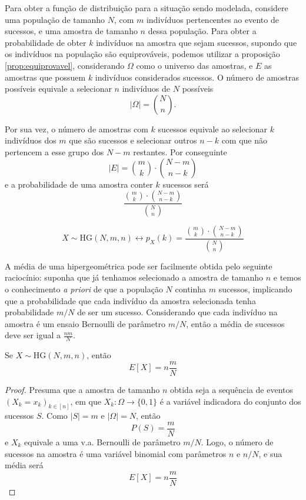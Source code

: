 Para obter a função de distribuição para a situação sendo modelada, considere uma população
de tamanho $N$, com $m$ indivíduos pertencentes ao evento de sucessos, e uma amostra de
tamanho $n$ dessa população. Para obter a probabilidade de obter $k$ indivíduos na amostra
que sejam sucessos, supondo que os indivíduos na população são equiprováveis, podemos
utilizar a proposição \ref{prop:equiprovavel}, considerando $\Omega$ como o universo das
amostras, e $E$ as amostras que possuem $k$ indivíduos considerados sucessos. O número de
amostras possíveis equivale a selecionar $n$ indivíduos de $N$ possíveis
\[
	|\Omega| = \binom{N}{n}.
\]

Por sua vez, o número de amostras com $k$ sucessos equivale ao selecionar $k$ indivíduos
dos $m$ que são sucessos e selecionar outros $n-k$ com que não pertencem a esse grupo dos
$N-m$ restantes. Por conseguinte
\[
	|E| = \binom{m}{k} \cdot \binom{N-m}{n-k}
\]
e a probabilidade de uma amostra conter $k$ sucessos será
\[
	\frac{\binom{m}{k} \cdot \binom{N-m}{n-k}}{\binom{N}{n}}
\]

\begin{def:hipergeometrica}
\[
	X \sim \mathrm{HG}(N, m, n) \longleftrightarrow p_X(k) =
	\frac{\binom{m}{k} \cdot \binom{N-m}{n-k}}{\binom{N}{n}}
\]
\end{def:hipergeometrica}

A média de uma hipergeométrica pode ser facilmente obtida pelo seguinte
raciocínio: suponha que já tenhamos selecionado a amostra de tamanho $n$ e temos
o conhecimento \textit{a priori} de que a população $N$ continha $m$ sucessos,
implicando que a probabilidade que cada indivíduo da amostra selecionada tenha
probabilidade $m / N$ de ser um sucesso. Considerando que cada indivíduo na
amostra é um ensaio Bernoulli de parâmetro $m / N$, então a média de sucessos
deve ser igual a $\frac{nm}{N}$.

\begin{prop:esperanca hipergeometrica}
Se $X \sim \mathrm{HG}(N, m, n)$, então
\[
	E[X] = n \frac{m}{N}
\]
\begin{proof}
	Presuma que a amostra de tamanho $n$ obtida seja a sequência de eventos
	$(X_k = x_k)_{k \in [n]}$, em que $X_k: \Omega \to \{0, 1\}$ é a variável indicadora
	do conjunto dos sucessos $S$. Como $|S| = m$ e $|\Omega| = N$, então
	\[
		P(S) = \frac{m}{N}
	\]
	e $X_k$ equivale a uma v.a. Bernoulli de parâmetro $m / N$. Logo, o número de
	sucessos na amostra é uma variável binomial com parâmetros $n$ e $n / N$, e sua
	média será
	\[
		E[X] = n \frac{m}{N}
	\]
\end{proof}
\end{prop:esperanca hipergeometrica}

